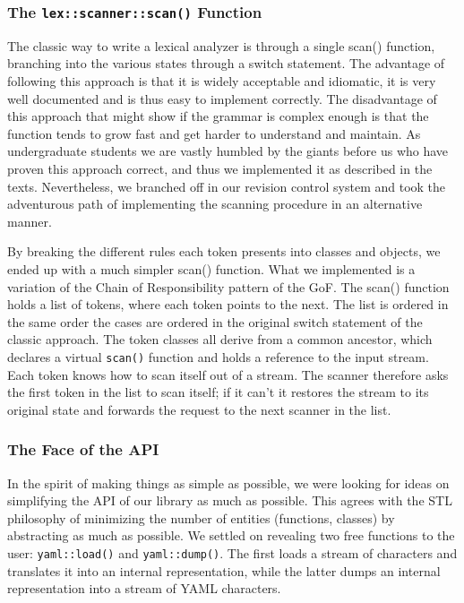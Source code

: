 \documentclass{article}
\begin{document}
\subsubsection{The \texttt{lex::scanner::scan()} Function}
\label{scan_function}
The classic way to write a lexical analyzer is through a single scan() 
function, branching into the various states through a switch statement.  The 
advantage of following this approach is that it is widely acceptable and 
idiomatic, it is very well documented and is thus easy to implement correctly.  
The disadvantage of this approach that might show if the grammar is complex 
enough is that the function tends to grow fast and get harder to understand and
maintain.  As undergraduate students we are vastly humbled by the giants before
us who have proven this approach correct, and thus we implemented it as
described in the texts.  Nevertheless, we branched off in our revision control
system and took the adventurous path of implementing the scanning procedure in
an alternative manner.

By breaking the different rules each token presents into classes and objects, 
we ended up with a much simpler scan() function.  What we implemented is a 
variation of the Chain of Responsibility pattern of the GoF.  The scan() 
function holds a list of tokens, where each token points to the next.  The list 
is ordered in the same order the cases are ordered in the original switch 
statement of the classic approach.  The token classes all derive from a common 
ancestor, which declares a virtual \texttt{scan()} function and holds a reference to the 
input stream.  Each token knows how to scan itself out of a stream.  The 
scanner therefore asks the first token in the list to scan itself;  if it can't 
it restores the stream to its original state and forwards the request to the
next scanner in the list.


\subsubsection{The Face of the API}
In the spirit of making things as simple as possible, we were looking for ideas 
on simplifying the API of our library as much as possible.  This agrees with 
the STL philosophy of minimizing the number of entities (functions, classes) by 
abstracting as much as possible.  We settled on revealing two free functions to 
the user:  \texttt{yaml::load()} and \texttt{yaml::dump()}.  The first loads a 
stream of characters and translates it into an internal representation, while 
the latter dumps an internal representation into a stream of YAML characters.
\end{document}
